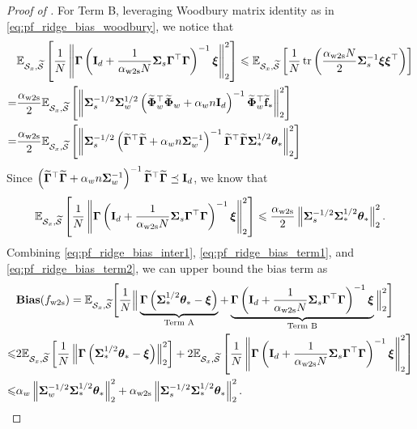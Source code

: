 \begin{proof}[Proof of ]
    For Term B, leveraging Woodbury matrix identity as in \eqref{eq:pf_ridge_bias_woodbury}, we notice that 
    \begin{align*}
        &\E_{\Scal_x, \wt\Scal}\sbr{\frac{1}{N} \nbr{\Gammab \rbr{\Ib_d + \frac{1}{\alpha_\wts N} \Sigmab_s \Gammab^\top \Gammab}^{-1} \xib}_2^2} 
        \le \E_{\Scal_x, \wt\Scal}\sbr{\frac{1}{N} \tr\rbr{\frac{\alpha_\wts N}{2} \Sigmab_s^{-1} \xib \xib^\top}} \\
        = &\frac{\alpha_\wts}{2} \E_{\Scal_x, \wt\Scal}\sbr{\nbr{\Sigmab_s^{-1/2} \Sigmab_w^{1/2} \rbr{\wt\Phib_w^\top \wt\Phib_w + \alpha_w n \Ib_d}^{-1} \wt\Phib_w^\top \wt\fb_*}_2^2} \\
        = &\frac{\alpha_\wts}{2} \E_{\Scal_x, \wt\Scal}\sbr{\nbr{\Sigmab_s^{-1/2} \rbr{\wt\Gammab^\top \wt\Gammab + \alpha_w n \Sigmab_w^{-1}}^{-1} \wt\Gammab^\top \wt\Gammab \Sigmab_*^{1/2} \thetab_*}_2^2}
    \end{align*}
    Since $\rbr{\wt\Gammab^\top \wt\Gammab + \alpha_w n \Sigmab_w^{-1}}^{-1} \wt\Gammab^\top \wt\Gammab \preceq \Ib_d$, we know that
    \begin{align}\label{eq:pf_ridge_bias_term2}
    \begin{split}
        \E_{\Scal_x, \wt\Scal}\sbr{\frac{1}{N} \nbr{\Gammab \rbr{\Ib_d + \frac{1}{\alpha_\wts N} \Sigmab_s \Gammab^\top \Gammab}^{-1} \xib}_2^2} 
        \le \frac{\alpha_\wts}{2} \nbr{\Sigmab_s^{-1/2} \Sigmab_*^{1/2} \thetab_*}_2^2.
    \end{split}
    \end{align}
    Combining \eqref{eq:pf_ridge_bias_inter1}, \eqref{eq:pf_ridge_bias_term1}, and \eqref{eq:pf_ridge_bias_term2}, we can upper bound the bias term as
    \begin{align}\label{eq:pf_ridge_bias_final}
    \begin{split}
        &\bias(f_\wts) = \E_{\Scal_x, \wt\Scal}\Bigg[\frac{1}{N} \Big\|\underbrace{\Gammab \rbr{\Sigmab_*^{1/2} \thetab_* - \xib}}_{\t{Term A}} + \underbrace{\Gammab \rbr{\Ib_d + \frac{1}{\alpha_\wts N} \Sigmab_s \Gammab^\top \Gammab}^{-1} \xib}_{\t{Term B}}\Big\|_2^2\Bigg] \\
        \le &2 \E_{\Scal_x, \wt\Scal}\sbr{\frac{1}{N} \nbr{\Gammab \rbr{\Sigmab_*^{1/2} \thetab_* - \xib}}_2^2} + 2 \E_{\Scal_x, \wt\Scal}\sbr{\frac{1}{N} \nbr{\Gammab \rbr{\Ib_d + \frac{1}{\alpha_\wts N} \Sigmab_s \Gammab^\top \Gammab}^{-1} \xib}_2^2} \\
        \le &\alpha_w \nbr{\Sigmab_w^{-1/2} \Sigmab_*^{1/2} \thetab_*}_2^2 + \alpha_\wts \nbr{\Sigmab_s^{-1/2} \Sigmab_*^{1/2} \thetab_*}_2^2.
    \end{split}
    \end{align}
    

\end{proof}
